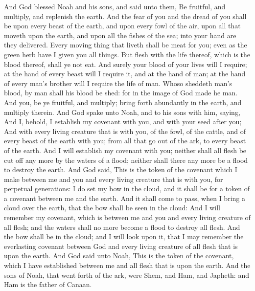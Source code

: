 \begin{biblechapter} %
 And God blessed Noah and his sons, and said unto them, Be fruitful, and multiply, and replenish the earth.
\verse And the fear of you and the dread of you shall be upon every beast of the earth, and upon every fowl of the air, upon all that moveth upon the earth, and upon all the fishes of the sea; into your hand are they delivered.
\verse Every moving thing that liveth shall be meat for you; even as the green herb have I given you all things.
\verse But flesh with the life thereof, which is the blood thereof, shall ye not eat.
\verse And surely your blood of your lives will I require; at the hand of every beast will I require it, and at the hand of man; at the hand of every man's brother will I require the life of man.
\verse Whoso sheddeth man's blood, by man shall his blood be shed: for in the image of God made he man.
\verse And you, be ye fruitful, and multiply; bring forth abundantly in the earth, and multiply therein.
\verse And God spake unto Noah, and to his sons with him, saying,
\verse And I, behold, I establish my covenant with you, and with your seed after you;
\verse And with every living creature that is with you, of the fowl, of the cattle, and of every beast of the earth with you; from all that go out of the ark, to every beast of the earth.
\verse And I will establish my covenant with you; neither shall all flesh be cut off any more by the waters of a flood; neither shall there any more be a flood to destroy the earth.
\verse And God said, This is the token of the covenant which I make between me and you and every living creature that is with you, for perpetual generations:
\verse I do set my bow in the cloud, and it shall be for a token of a covenant between me and the earth.
\verse And it shall come to pass, when I bring a cloud over the earth, that the bow shall be seen in the cloud:
\verse And I will remember my covenant, which is between me and you and every living creature of all flesh; and the waters shall no more become a flood to destroy all flesh.
\verse And the bow shall be in the cloud; and I will look upon it, that I may remember the everlasting covenant between God and every living creature of all flesh that is upon the earth.
\verse And God said unto Noah, This is the token of the covenant, which I have established between me and all flesh that is upon the earth.
 And the sons of Noah, that went forth of the ark, were Shem, and Ham, and Japheth: and Ham is the father of Canaan.

\end{biblechapter}
